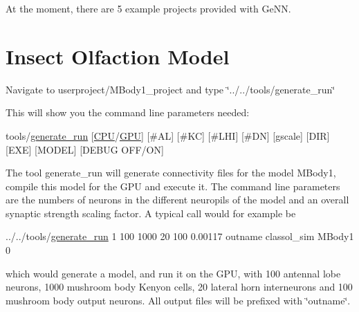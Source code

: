 At the moment, there are 5 example projects provided with Ge\+N\+N.\hypertarget{2_examples_ex_mbody}{}\section{Insect Olfaction Model}\label{2_examples_ex_mbody}
Navigate to userproject/\+M\+Body1\+\_\+project and type \char`\"{}../../tools/generate\+\_\+run\char`\"{}

This will show you the command line parameters needed\+: 
\begin{DoxyCode}
tools/\hyperlink{userproject_2MBody__userdef__project_2README_8txt_a320a215d1e27b4de394be70e90d22863}{generate\_run} [\hyperlink{README_8txt_a74a069e3c75797de2636c4dd14daa147}{CPU}/\hyperlink{modelSpec_8h_a39cb9803524b6f3b783344b2f89867b4}{GPU}] [#AL] [#KC] [#LHI] [#DN] [gscale] [DIR] [EXE] [MODEL] [DEBUG
       OFF/ON]
\end{DoxyCode}
 The tool generate\+\_\+run will generate connectivity files for the model M\+Body1, compile this model for the G\+P\+U and execute it. The command line parameters are the numbers of neurons in the different neuropils of the model and an overall synaptic strength scaling factor. A typical call would for example be 
\begin{DoxyCode}
../../tools/\hyperlink{userproject_2MBody__userdef__project_2README_8txt_a320a215d1e27b4de394be70e90d22863}{generate\_run} 1 100 1000 20 100 0.00117 outname classol\_sim MBody1 0
\end{DoxyCode}
 which would generate a model, and run it on the G\+P\+U, with 100 antennal lobe neurons, 1000 mushroom body Kenyon cells, 20 lateral horn interneurons and 100 mushroom body output neurons. All output files will be prefixed with \char`\"{}outname\char`\"{}.

